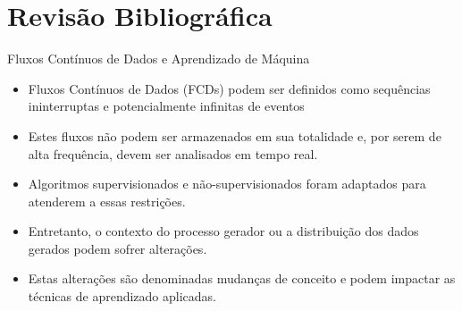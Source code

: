 \documentclass[10pt]{beamer}
\begin{document}
\section{Revisão Bibliográfica}


\begin{frame}{Fluxos Contínuos de Dados e Aprendizado de Máquina}
    \begin{itemize}
        \item<1 -> \alert{Fluxos Contínuos de Dados (FCDs)} podem ser definidos como sequências ininterruptas e potencialmente infinitas de eventos \cite{Aggarwal:2006:DSM:1196418}
        \item<2 -> Estes fluxos não podem ser armazenados em sua totalidade e, por serem de alta frequência, devem ser analisados em tempo real.
        \item<3 -> Algoritmos supervisionados \cite{Domingos:2000:MHD:347090.347107, Bifet:2013:EDS:2480362.2480516, Wang:2003:MCD:956750.956778, Aggarwal:2004:DCD:1014052.1014110, Gama:2003:ADT:956750.956813} e não-supervisionados \cite{Aggarwal:2003:FCE:1315451.1315460, Ackermann:2012:SCA:2133803.2184450, Kranen:2011:CIM:2134350.2134352} foram adaptados para atenderem a essas restrições.
        \item<4 -> Entretanto, o contexto do processo gerador ou a distribuição dos dados gerados podem sofrer alterações.
        \item<5 -> Estas alterações são denominadas \alert{mudanças de conceito} e podem impactar as técnicas de aprendizado aplicadas.
      \end{itemize}
\end{frame}

\end{document}
